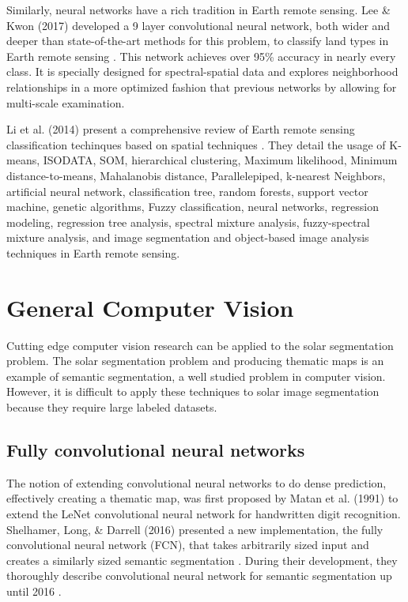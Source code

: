 \documentclass[twoside]{report}
\begin{document}
Similarly, neural networks have a rich tradition in Earth remote sensing. Lee \& Kwon (2017) developed a 9 layer convolutional neural network, both wider and deeper than state-of-the-art methods for this problem, to classify land types in Earth remote sensing \cite{lee2017going}. This network achieves over 95\% accuracy in nearly every class. It is specially designed for spectral-spatial data and explores neighborhood relationships in a more optimized fashion that previous networks by allowing for multi-scale examination.

Li et al. (2014) present a comprehensive review of Earth remote sensing classification techinques based on spatial techniques \cite{li2014review}. They detail the usage of K-means, ISODATA, SOM,
hierarchical clustering, Maximum likelihood, Minimum distance-to-means, Mahalanobis distance, Parallelepiped, k-nearest Neighbors,  artificial neural network, classification tree, random forests, support vector
machine, genetic algorithms, Fuzzy classification, neural networks, regression modeling, regression tree analysis, spectral mixture analysis, fuzzy-spectral mixture analysis,  and image segmentation and object-based image
analysis techniques in Earth remote sensing. 

\section{General Computer Vision}
Cutting edge computer vision research can be applied to the solar segmentation problem. The solar segmentation problem and producing thematic maps is an example of semantic segmentation, a well studied problem in computer vision. However, it is difficult to apply these techniques to solar image segmentation because they require large labeled datasets. 

\subsection{Fully convolutional neural networks}
The notion of extending convolutional neural networks to do dense prediction, effectively creating a thematic map, was first proposed by Matan et al. (1991) \cite{matan} to extend the LeNet convolutional neural network \cite{lenet} for handwritten digit recognition. Shelhamer, Long, \& Darrell (2016) presented a new implementation, the fully convolutional neural network (FCN), that takes arbitrarily sized input and creates a similarly sized semantic segmentation \cite{fcnn}. During their development, they thoroughly describe convolutional neural network for semantic segmentation up until 2016 \cite{fcnn}.
\end{document}
